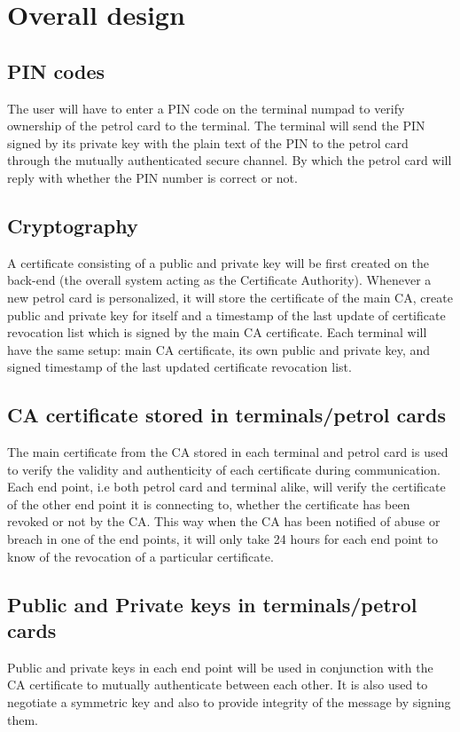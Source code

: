 \section{Overall design}
\subsection{PIN codes}
The user will have to enter a PIN code on the terminal numpad to verify ownership of the petrol card to the terminal. The terminal will send the PIN signed by its private key with the plain text of the PIN to the petrol card through the mutually authenticated secure channel. By which the petrol card will reply with whether the PIN number is correct or not.

\subsection{Cryptography}
A certificate consisting of a public and private key will be first created on the back-end (the overall system acting as the Certificate Authority). Whenever a new petrol card is personalized, it will store the certificate of the main CA, create public and private key for itself and a timestamp of the last update of certificate revocation list which is signed by the main CA certificate. Each terminal will have the same setup: main CA certificate, its own public and private key, and signed timestamp of the last updated certificate revocation list.

\subsection{CA certificate stored in terminals/petrol cards}
The main certificate from the CA stored in each terminal and petrol card is used to verify the validity and authenticity of each certificate during communication. Each end point, i.e both petrol card and terminal alike, will verify the certificate of the other end point it is connecting to, whether the certificate has been revoked or not by the CA. This way when the CA has been notified of abuse or breach in one of the end points, it will only take 24 hours for each end point to know of the revocation of a particular certificate.

\subsection{Public and Private keys in terminals/petrol cards}
Public and private keys in each end point will be used in conjunction with the CA certificate to mutually authenticate between each other. It is also used to negotiate a symmetric key and also to provide integrity of the message by signing them.

